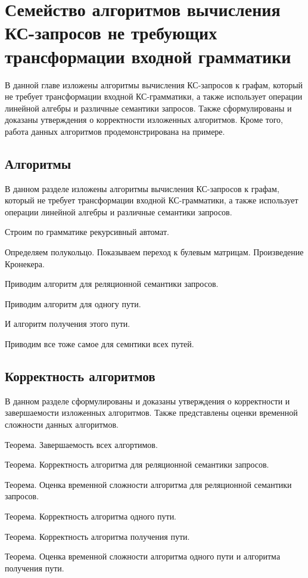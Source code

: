 \chapter{Семейство алгоритмов вычисления КС-запросов не требующих трансформации входной грамматики}\label{ch:ch4}
В данной главе изложены алгоритмы вычисления КС-запросов к графам, который не требует трансформации входной КС-грамматики, а также использует операции линейной алгебры и различные семантики запросов. Также сформулированы и доказаны утверждения о корректности изложенных алгоритмов. Кроме того, работа данных алгоритмов продемонстрирована на примере. 
\section{Алгоритмы}\label{sec:ch4/sect1}
В данном разделе изложены алгоритмы вычисления КС-запросов к графам, который не требует трансформации входной КС-грамматики, а также использует операции линейной алгебры и различные семантики запросов.

Строим по грамматике рекурсивный автомат.

Определяем полукольцо. Показываем переход к булевым матрицам. Произведение Кронекера.

Приводим алгоритм для реляционной семантики запросов.

Приводим алгоритм для одногу пути.

И алгоритм получения этого пути.

Приводим все тоже самое для семнтики всех путей.

\section{Корректность алгоритмов}\label{sec:ch4/sect2}
В данном разделе сформулированы и доказаны утверждения о корректности и завершаемости изложенных алгоритмов. Также представлены оценки временной сложности данных алгоритмов.

Теорема. Завершаемость всех алгортимов.

Теорема. Корректность алгоритма для реляционной семантики запросов.

Теорема. Оценка временной сложности алгоритма для реляционной семантики запросов.

Теорема. Корректность алгоритма одного пути.

Теорема. Корректность алгоритма получения пути.

Теорема. Оценка временной сложности алгоритма одного пути и алгоритма получения пути.

